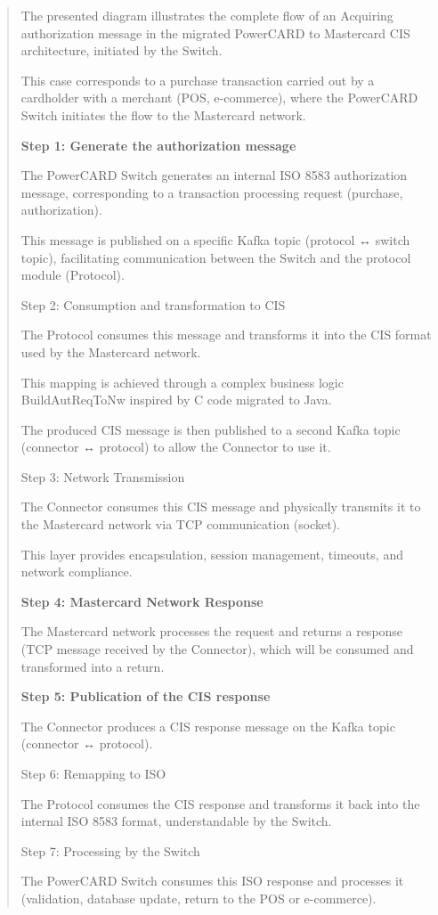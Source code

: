 \documentclass[12pt,a4paper]{report}
\begin{document}
\begin{quote}
The presented diagram illustrates the complete flow of an Acquiring
authorization message in the migrated PowerCARD to Mastercard CIS
architecture, initiated by the Switch.

This case corresponds to a purchase transaction carried out by a
cardholder with a merchant (POS, e-commerce), where the PowerCARD Switch
initiates the flow to the Mastercard network.

\textbf{Step 1: Generate the authorization message}

The PowerCARD Switch generates an internal ISO 8583 authorization
message, corresponding to a transaction processing request (purchase,
authorization).

This message is published on a specific Kafka topic (protocol ↔ switch
topic), facilitating communication between the Switch and the protocol
module (Protocol).

Step 2: Consumption and transformation to CIS

The Protocol consumes this message and transforms it into the CIS format
used by the Mastercard network.

This mapping is achieved through a complex business logic
BuildAutReqToNw inspired by C code migrated to Java.

The produced CIS message is then published to a second Kafka topic
(connector ↔ protocol) to allow the Connector to use it.

Step 3: Network Transmission

The Connector consumes this CIS message and physically transmits it to
the Mastercard network via TCP communication (socket).

This layer provides encapsulation, session management, timeouts, and
network compliance.

\textbf{Step 4: Mastercard Network Response}

The Mastercard network processes the request and returns a response (TCP
message received by the Connector), which will be consumed and
transformed into a return.

\textbf{Step 5: Publication of the CIS response}

The Connector produces a CIS response message on the Kafka topic
(connector ↔ protocol).

Step 6: Remapping to ISO

The Protocol consumes the CIS response and transforms it back into the
internal ISO 8583 format, understandable by the Switch.

Step 7: Processing by the Switch

The PowerCARD Switch consumes this ISO response and processes it
(validation, database update, return to the POS or e-commerce).
\end{quote}
\end{document}
